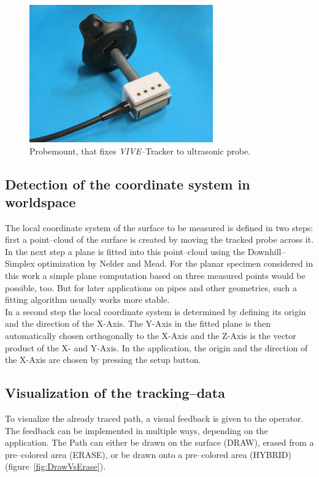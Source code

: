 \documentclass{VRARWorkshop}
\begin{document}
\begin{figure}[h!]
  \label{fig:probemount}
    \begin{center}
        \includegraphics[width=79mm]{images/probemount}
        \caption{\label{fig:probemount} Probemount, that fixes \textit{VIVE--}Tracker to ultrasonic probe.}
    \end{center}
\end{figure}

\subsection{Detection of the coordinate system in worldspace}
The local coordinate system of the surface to be measured is defined in two steps:
first a point--cloud of the surface is created by moving the tracked probe across it.
In the next step a plane is fitted into this point--cloud using the Downhill--Simplex optimization by Nelder and Mead. For the planar specimen considered in this work a simple plane computation based on three measured points
would be possible, too. But for later applications on pipes and other geometries, such a fitting algorithm usually works more stable. \\
In a second step the local coordinate system is determined by defining its origin and the direction of the X-Axis. 
The Y-Axis in the fitted plane is then automatically chosen orthogonally to the X-Axis and the Z-Axis is the vector product of the X- and Y-Axis. 
In the application, the origin and the direction of the X-Axis are chosen by pressing the setup button.

\subsection{Visualization of the tracking--data}
\label{sec:DrawVsErase}
To visualize the already traced path, a visual feedback is given to the operator.
The feedback can be implemented in multiple ways, depending on the application.
The Path can either be drawn on the surface (DRAW), erased from a pre--colored area (ERASE), or be drawn onto a pre--colored area (HYBRID) (figure~\ref{fig:DrawVsErase}).
\end{document}
